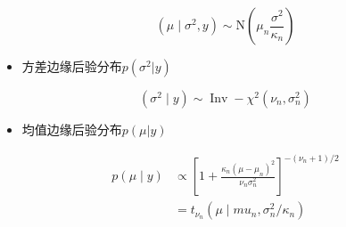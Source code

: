 \[(\mu \mid \sigma^{2}, y) \sim \mathrm{N}\left(\mu_{n} \frac{\sigma^{2}}{\kappa_{n}}\right)\]

\begin{itemize}
\item
  方差边缘后验分布\(p(\sigma^2|y)\)
\end{itemize}

\[(\sigma^{2} \mid y) \sim \operatorname{Inv}-\chi^{2}\left(\nu_{n}, \sigma_{n}^{2}\right)\]

\begin{itemize}
\item
  均值边缘后验分布\(p(\mu|y)\)
\end{itemize}

\begin{equation}
  \begin{aligned}
    p(\mu \mid y) 
    & \propto\left[1+\frac{\kappa_{n}\left(\mu-\mu_{n}\right)^{2}}{\nu_{n} \sigma_{n}^{2}}\right]^{-\left(\nu_{n}+1\right) / 2} \\
    & = t_{\nu_{n}}\left(\mu \mid m u_{n}, \sigma_{n}^{2} / \kappa_{n}\right)
  \end{aligned}
\end{equation}
